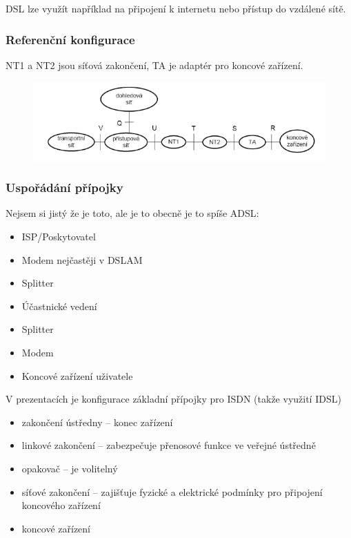 DSL lze využít například  na připojení k internetu nebo přístup do vzdálené sítě.

\subsubsection{Referenční konfigurace}

NT1 a NT2 jsou síťová zakončení, TA je adaptér pro koncové zařízení.

\begin{figure}[h]
    \centering
    \includegraphics[width=\textwidth]{images/070.png}
\end{figure}

\subsubsection{Uspořádání přípojky}

Nejsem si jistý že je toto, ale je to obecně je to spíše ADSL:

\begin{itemize}
    \item ISP/Poskytovatel
    \item Modem nejčastěji v DSLAM
    \item Splitter
    \item Účastnické vedení
    \item Splitter
    \item Modem
    \item Koncové zařízení uživatele
\end{itemize}

V prezentacích je konfigurace základní přípojky pro ISDN (takže využití IDSL)

\begin{itemize}
    \item zakončení ústředny -- konec zařízení
    \item linkové zakončení -- zabezpečuje přenosové funkce ve veřejné ústředně
    \item opakovač -- je volitelný
    \item síťové zakončení -- zajišťuje fyzické a elektrické podmínky pro připojení koncového zařízení
    \item koncové zařízení
\end{itemize}

